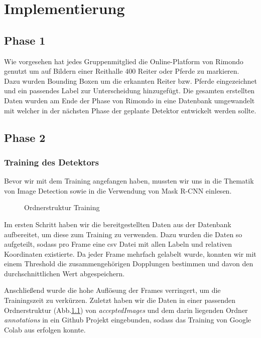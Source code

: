 \chapter{Implementierung}
\label{ch:implementierung}

\section{Phase 1}
Wie vorgesehen hat jedes Gruppenmitglied die Online-Platform von Rimondo genutzt um auf Bildern einer Reithalle 400 Reiter oder Pferde zu markieren. Dazu wurden Bounding Boxen um die erkannten Reiter bzw. Pferde eingezeichnet und ein passendes Label zur Unterscheidung hinzugefügt. Die gesamten erstellten Daten wurden am Ende der Phase von Rimondo in eine Datenbank umgewandelt mit welcher in der nächsten Phase der geplante Detektor entwickelt werden sollte.

\section{Phase 2}
\subsection*{Training des Detektors}
Bevor wir mit dem Training angefangen haben, mussten wir uns in die Thematik von Image Detection sowie in die Verwendung von Mask R-CNN einlesen.

\begin{figure}
\caption{Ordnerstruktur Training}
\label{fig:folderstructure}
\end{figure}

Im ersten Schritt haben wir die bereitgestellten Daten aus der Datenbank aufbereitet, um diese zum Training zu verwenden. Dazu wurden die Daten so aufgeteilt, sodass pro Frame eine csv Datei mit allen Labeln und relativen Koordinaten existierte. Da jeder Frame mehrfach gelabelt wurde, konnten wir mit einem Threshold die zusammengehörigen Dopplungen bestimmen und davon den durchschnittlichen Wert abgespeichern. 



Anschließend wurde die hohe Auflösung der Frames verringert, um die Trainingszeit zu verkürzen. Zuletzt haben wir die Daten in einer passenden Ordnerstruktur (Abb.\ref{fig:folderstructure}) von \emph{ acceptedImages} und dem darin liegenden Ordner \emph{annotations} in ein Github Projekt eingebunden, sodass das Training von Google Colab aus erfolgen konnte.

